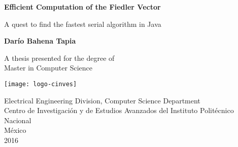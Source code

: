 \begin{titlepage}
  \begin{center}
    \vspace*{1cm}

    {\Large \textbf{Efficient Computation of the Fiedler Vector}}

    \vspace{0.5cm}
    A quest to find the fastest serial algorithm in Java

    \vspace{1.5cm}

    \textbf{Darío Bahena Tapia}

    \vfill

    A thesis presented for the degree of\\
    Master in Computer Science

    \vspace{0.8cm}

    \texttt{[image: logo-cinves]}

    \vspace{0.8cm}
    {
      \footnotesize
      Electrical Engineering Division, Computer Science Department\\
      Centro de Investigación y de Estudios Avanzados del Instituto Politécnico Nacional\\
      México\\
      2016
    }

  \end{center}
\end{titlepage}
